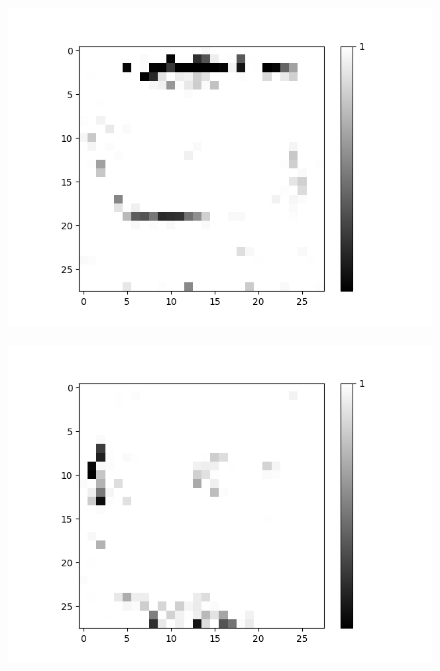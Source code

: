 \begin{figure}[H]
	\centering
	\begin{minipage}[b]{0.19\textwidth}
		\captionsetup{labelformat=empty}
		\includegraphics[width=\textwidth]{OR-AND(OLD)(W-LSM)(1)/Layer0-Neuron-0.png}
		\label{}
	\end{minipage}
	\begin{minipage}[b]{0.19\textwidth}
		\captionsetup{labelformat=empty}
		\includegraphics[width=\textwidth]{OR-AND(OLD)(W-LSM)(1)/Layer0-Neuron-2.png}
		\label{}
	\end{minipage}
	\begin{minipage}[b]{0.19\textwidth}

\end{minipage}
\end{figure}
